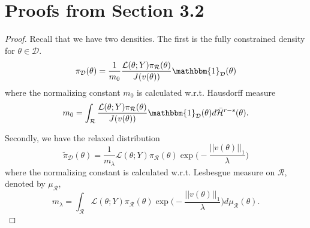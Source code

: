 \documentclass[10pt,fleqn]{article}
\newcommand{\bb}[1]{\mathbb{#1}} \newcommand{\mc}[1]{\mathcal{#1}}
\DeclareMathOperator{\1}{\mathbbm{1}} \DeclareMathOperator{\bigO}{\mc O}
\begin{document}
\section{Proofs from Section 3.2}

\begin{proof}
Recall that we have two densities. The first is the fully constrained density for $\theta\in\mathcal{D}$.
\begin{equation*}
\pi_\mathcal{D}(\theta) = \frac{1}{m_0} \frac{\mathcal{L}(\theta;Y)\pi_\mathcal{R}(\theta)}{J(v(\theta))}\mathbbm{1}_\mathcal{D}(\theta)
\end{equation*}
where the normalizing constant $m_0$ is calculated w.r.t. Hausdorff measure
$$m_0 = \int_\mathcal{R} \frac{\mathcal{L}(\theta;Y)\pi_\mathcal{R}(\theta)}{J(v(\theta))}\mathbbm{1}_\mathcal{D}(\theta)d\bar{\mathcal{H}}^{r-s}(\theta).$$

Secondly, we have the relaxed distribution
$$\tilde{\pi}_\mathcal{D}(\theta) = \frac{1}{m_\lambda} \mathcal{L}(\theta;Y)\pi_\mathcal{R}(\theta)\exp\bigg(-\frac{||v(\theta)||_1}{\lambda}\bigg)$$
where the normalizing constant is calculated w.r.t. Lesbesgue measure on $\mathcal{R}$, denoted by $\mu_\mathcal{R}$,
$$m_\lambda = \int_\mathcal{R}\mathcal{L}(\theta;Y)\pi_\mathcal{R}(\theta)\exp\bigg(-\frac{||v(\theta)||_1}{\lambda}\bigg) d\mu_\mathcal{R}(\theta).$$




\end{proof}
\end{document}
